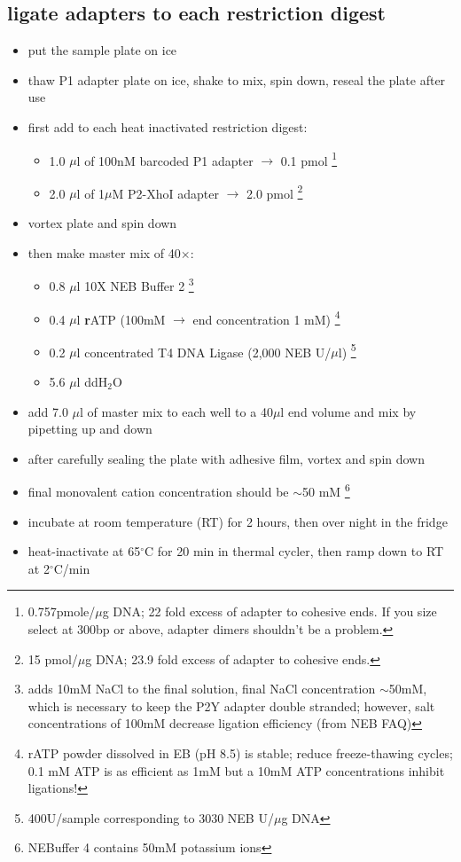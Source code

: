 \subsection
{ligate adapters to each restriction digest}
\begin{itemize}
\item put the sample plate on ice
\item thaw P1 adapter plate on ice, shake to mix, spin down, reseal the plate after use
\item first add to each heat inactivated restriction digest:
	\begin{itemize}
	\item 1.0 $\mu$l of 100nM barcoded P1 adapter $\rightarrow$ 0.1 pmol \footnote{0.757pmole/$\mu$g DNA; 22 fold excess of adapter to cohesive ends. If you size select at 300bp or above, adapter dimers shouldn't be a problem.}
	\item 2.0 $\mu$l of 1$\mu$M P2-XhoI adapter $\rightarrow$ 2.0 pmol \footnote{15 pmol/$\mu$g DNA; 23.9 fold excess of adapter to cohesive ends.}
	\end{itemize}
\item vortex plate and spin down
\item then make master mix of 40$\times$:
\begin{itemize}
\item 0.8 $\mu$l 10X NEB Buffer 2 \footnote{adds 10mM NaCl to the final solution, final NaCl concentration $\sim$50mM, which is necessary to keep the P2Y adapter double stranded; however, salt concentrations of 100mM decrease ligation efficiency (from NEB FAQ)}
\item 0.4 $\mu$l \textbf{r}ATP (100mM $\rightarrow$ end concentration 1 mM) \footnote{rATP powder dissolved in EB (pH 8.5) is stable; reduce freeze-thawing cycles;  0.1 mM ATP is as efficient as 1mM but a 10mM ATP concentrations inhibit ligations!}
\item 0.2 $\mu$l concentrated T4 DNA Ligase (2,000 NEB U/$\mu$l) \footnote{400U/sample corresponding to 3030 NEB U/$\mu$g DNA}
\item 5.6 $\mu$l ddH$_{2}$O
\end{itemize}
\item add 7.0 $\mu$l of master mix to each well to a 40$\mu$l end volume and mix by pipetting up and down
\item after carefully sealing the plate with adhesive film, vortex and spin down
\item final monovalent cation concentration should be $\sim$50 mM \footnote{NEBuffer 4 contains 50mM potassium ions}
\item incubate at room temperature (RT) for 2 hours, then over night in the fridge
\item heat-inactivate at 65$^{\circ}$C for 20 min in thermal cycler, then ramp down to RT at 2$^{\circ}$C/min
\end{itemize}

